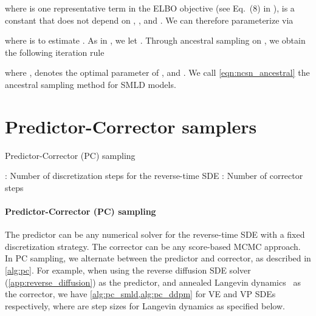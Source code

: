 \documentclass{article} \usepackage{iclr2021_conference,times}
\begin{document}
where  is one representative term in the ELBO objective (see Eq.~(8) in \citet{ho2020denoising}),  is a constant that does not depend on , , and . We can therefore parameterize  via

where  is to estimate . As in \citet{ho2020denoising}, we let . Through ancestral sampling on , we obtain the following iteration rule

where ,  denotes the optimal parameter of , and . We call \cref{eqn:ncsn_ancestral} the ancestral sampling method for SMLD models.


\section{Predictor-Corrector samplers}\label{app:pc}

\begin{algorithm}[!t]
   \caption{Predictor-Corrector (PC) sampling}
   \label{alg:pc}
    \begin{algorithmic}[1]
        \Require    
            \Statex : Number of discretization steps for the reverse-time SDE
            \Statex : Number of corrector steps
        \State 
            \State 
         \EndFor
       \EndFor
    \end{algorithmic}
    \end{algorithm}

\paragraph{Predictor-Corrector (PC) sampling} 
The predictor can be any numerical solver for the reverse-time SDE with a fixed discretization strategy. The corrector can be any score-based MCMC approach. In PC sampling, we alternate between the predictor and corrector, as described in \cref{alg:pc}. For example, when using the reverse diffusion SDE solver (\cref{app:reverse_diffusion}) as the predictor, and annealed Langevin dynamics~\citep{song2019generative} as the corrector, we have \cref{alg:pc_smld,alg:pc_ddpm} for VE and VP SDEs respectively, where  are step sizes for Langevin dynamics as specified below.
\end{document}
